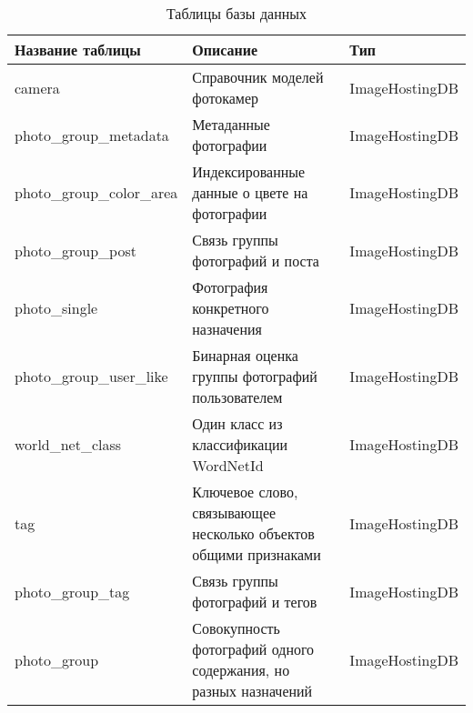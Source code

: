 \begin{table}[H]
  \caption{\onehalfspacing Таблицы базы данных}\label{database-table}
  \begin{tabular}{|p{6cm}|p{6cm}|p{4cm}|}
  \hline Название таблицы & Описание & Тип \\
  \hline camera & Справочник моделей фотокамер & ImageHostingDB \\
  \hline photo_group_metadata & Метаданные фотографии & ImageHostingDB \\
  \hline photo_group_color_area & Индексированные данные о цвете на фотографии & ImageHostingDB \\
  \hline photo_group_post & Связь группы фотографий и поста & ImageHostingDB \\
  \hline photo_single & Фотография конкретного назначения & ImageHostingDB \\
  \hline photo_group_user_like & Бинарная оценка группы фотографий пользователем & ImageHostingDB \\
  \hline world_net_class & Один класс из классификации WordNetId & ImageHostingDB \\
  \hline tag & Ключевое слово, связывающее несколько объектов общими признаками & ImageHostingDB \\
  \hline photo_group_tag & Связь группы фотографий и тегов & ImageHostingDB \\
  \hline photo_group & Совокупность фотографий одного содержания, но разных назначений & ImageHostingDB \\
  \end{tabular}
\end{table}

